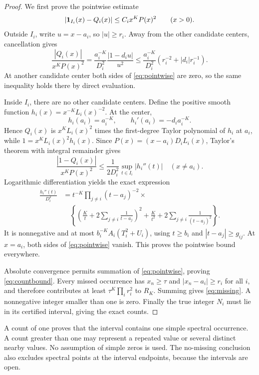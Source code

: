 \begin{proof}
We first prove the pointwise estimate
\begin{equation}\label{eq:pointwise}
 |\mathbf 1_{I_i}(x)-Q_i(x)|\le C_i x^K P(x)^2\qquad(x>0).
\end{equation}
Outside $I_i$, write $u=x-a_i$, so $|u|\ge r_i$. Away from the other
candidate centers, cancellation gives
\[
 \frac{|Q_i(x)|}{x^KP(x)^2}
 =\frac{a_i^{-K}}{D_i^2}\frac{|1-d_iu|}{u^2}
 \le\frac{a_i^{-K}}{D_i^2}\left(r_i^{-2}+|d_i|r_i^{-1}\right).
\]
At another candidate center both sides of \eqref{eq:pointwise} are zero,
so the same inequality holds there by direct evaluation.

Inside $I_i$, there are no other candidate centers. Define the positive
smooth function $h_i(x)=x^{-K}L_i(x)^{-2}$. At the center,
\[
 h_i(a_i)=a_i^{-K},\qquad h_i'(a_i)=-d_i a_i^{-K}.
\]
Hence $Q_i(x)$ is $x^KL_i(x)^2$ times the first-degree Taylor polynomial
of $h_i$ at $a_i$, while $1=x^KL_i(x)^2h_i(x)$. Since
$P(x)=(x-a_i)D_iL_i(x)$, Taylor's theorem with integral remainder gives
\[
 \frac{|1-Q_i(x)|}{x^KP(x)^2}
 \le\frac1{2D_i^2}\sup_{t\in I_i}|h_i''(t)|
 \quad(x\ne a_i).
\]
Logarithmic differentiation yields the exact expression
\begin{align*}
 \frac{h_i''(t)}{D_i^2}
 &=t^{-K}\prod_{j\ne i}(t-a_j)^{-2}\times{}\\[-2pt]
 &\quad\left\{
 \left(\frac Kt+2\sum_{j\ne i}\frac1{t-a_j}\right)^2
 +\frac K{t^2}+2\sum_{j\ne i}\frac1{(t-a_j)^2}\right\}.
\end{align*}
It is nonnegative and at most $b_i^{-K}A_i(T_i^2+U_i)$, using
$t\ge b_i$ and $|t-a_j|\ge g_{ij}$. At $x=a_i$, both sides of
\eqref{eq:pointwise} vanish. This proves the pointwise bound everywhere.

Absolute convergence permits summation of \eqref{eq:pointwise}, proving
\eqref{eq:countbound}. Every missed occurrence has $x_n\ge\tau$ and
$|x_n-a_i|\ge r_i$ for all $i$, and therefore contributes at least
$\tau^K\prod_i r_i^2$ to $R_K$. Summing gives \eqref{eq:missing}.
A nonnegative integer smaller than one is zero. Finally the true integer
$N_i$ must lie in its certified interval, giving the exact counts.
\end{proof}

\begin{remark}
A count of one proves that the interval contains one simple spectral
occurrence. A count greater than one may represent a repeated value or
several distinct nearby values. No assumption of simple zeros is used.
The no-missing conclusion also excludes spectral points at the interval
endpoints, because the intervals are open.
\end{remark}

